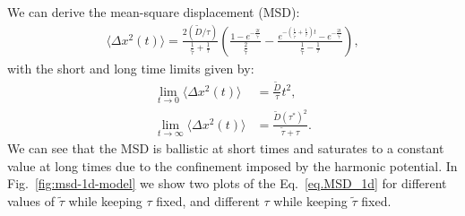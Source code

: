 \documentclass[%
10pt,
superscriptaddress,
twocolumn,
 amsmath,amssymb,
 aps,prx,
]{revtex4-2}
\begin{document}
We can derive the mean-square displacement (MSD):
%
\begin{align}
    \label{eq.MSD_1d}
    \langle \Delta x^2(t)\rangle = \frac{2(\tilde{D}/\tau)}{\frac{1}{\tilde{\tau}}+\frac{1}{\tau}}\left(\frac{1-e^{-\frac{2t}{\tilde{\tau}}}}{\frac{2}{\tilde{\tau}}}-\frac{e^{-(\frac{1}{\tilde{\tau}}+\frac{1}{\tau})t}-e^{-\frac{2t}{\tilde{\tau}}}}{\frac{1}{\tilde{\tau}}-\frac{1}{\tau}}\right),
\end{align}
%
with the short and long time limits given by:
%
\begin{align}
    \label{eq.limits}
    \lim_{t\to0} \langle \Delta x^2(t)\rangle & = \frac{\tilde{D}}{\tau}t^2,\\
    \lim_{t\to\infty} \langle \Delta x^2(t)\rangle & =\frac{\tilde{D}(\tau^*)^2}{\tilde{\tau}+\tau}.
\end{align}
%
We can see that the MSD is ballistic at short times and saturates to a constant value at long times due to the confinement imposed by the harmonic potential. In Fig.~\ref{fig:msd-1d-model} we show two plots of the Eq.~\ref{eq.MSD_1d} for different values of $\tilde{\tau}$ while keeping $\tau$ fixed, and different $\tau$ while keeping $\tilde{\tau}$ fixed.
\end{document}
